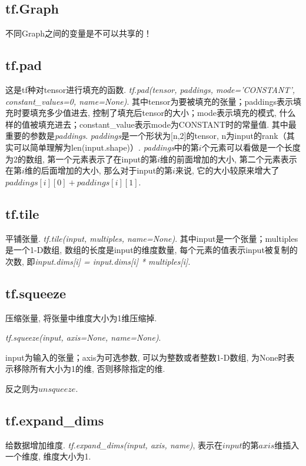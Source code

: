 \subsection{tf.Graph}
不同Graph之间的变量是不可以共享的！


\subsection{tf.pad}
这是tf种对tensor进行填充的函数. \textit{tf.pad(tensor, paddings, mode='CONSTANT', constant\_values=0, name=None)}. 其中tensor为要被填充的张量；paddings表示填充时要填充多少值进去, 控制了填充后tensor的大小；mode表示填充的模式, 什么样的值被填充进去；constant\_value表示mode为CONSTANT时的常量值. 其中最重要的参数是\textit{paddings}. \textit{paddings}是一个形状为[n,2]的tensor, n为input的rank（其实可以简单理解为len(input.shape)）. \textit{paddings}中的第$i$个元素可以看做是一个长度为2的数组, 第一个元素表示了在input的第$i$维的前面增加的大小, 第二个元素表示在第$i$维的后面增加的大小, 那么对于input的第$i$来说, 它的大小较原来增大了$paddings[i][0]+paddings[i][1]$. 

\subsection{tf.tile}平铺张量. \textit{tf.tile(input, multiples, name=None)}. 其中input是一个张量；multiples是一个1-D数组, 数组的长度是input的维度数量, 每个元素的值表示input被复制的次数, 即\textit{input.dims[i] = input.dims[i] * multiples[i]}. 

\subsection{tf.squeeze}压缩张量, 将张量中维度大小为1维压缩掉. 

\textit{tf.squeeze(input, axis=None, name=None)}. 

input为输入的张量；axis为可选参数, 可以为整数或者整数1-D数组, 为None时表示移除所有大小为1的维, 否则移除指定的维. 

反之则为$unsqueeze$. 

\subsection{tf.expand\_dims}给数据增加维度. \textit{tf.expand\_dims(input, axis, name)}, 表示在$input$的第$axis$维插入一个维度, 维度大小为1. 


